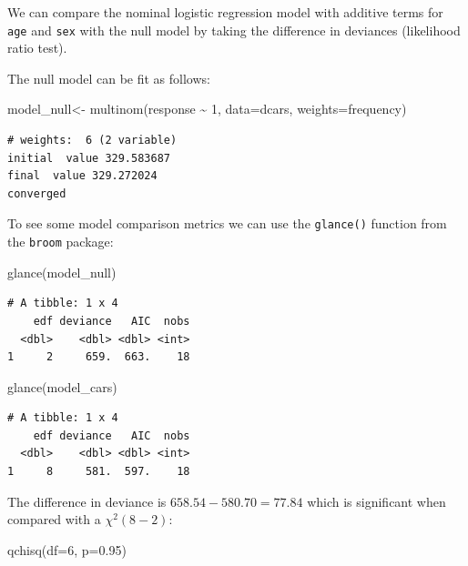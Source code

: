 \documentclass[
  letterpaper,
  DIV=11,
  numbers=noendperiod]{scrartcl}
\newenvironment{Shaded}{\begin{snugshade}}{\end{snugshade}}
\newcommand{\AttributeTok}[1]{\textcolor[rgb]{0.40,0.45,0.13}{#1}}
\newcommand{\DecValTok}[1]{\textcolor[rgb]{0.68,0.00,0.00}{#1}}
\newcommand{\FloatTok}[1]{\textcolor[rgb]{0.68,0.00,0.00}{#1}}
\newcommand{\FunctionTok}[1]{\textcolor[rgb]{0.28,0.35,0.67}{#1}}
\newcommand{\NormalTok}[1]{\textcolor[rgb]{0.00,0.23,0.31}{#1}}
\newcommand{\OtherTok}[1]{\textcolor[rgb]{0.00,0.23,0.31}{#1}}
\newcommand{\SpecialCharTok}[1]{\textcolor[rgb]{0.37,0.37,0.37}{#1}}
\begin{document}
We can compare the nominal logistic regression model with additive terms
for \texttt{age} and \texttt{sex} with the null model by taking the
difference in deviances (likelihood ratio test).

The null model can be fit as follows:

\begin{Shaded}
\begin{Highlighting}[]
\NormalTok{model\_null}\OtherTok{\textless{}{-}} \FunctionTok{multinom}\NormalTok{(response }\SpecialCharTok{\textasciitilde{}} \DecValTok{1}\NormalTok{, }\AttributeTok{data=}\NormalTok{dcars, }\AttributeTok{weights=}\NormalTok{frequency)}
\end{Highlighting}
\end{Shaded}

\begin{verbatim}
# weights:  6 (2 variable)
initial  value 329.583687 
final  value 329.272024 
converged
\end{verbatim}

To see some model comparison metrics we can use the \texttt{glance()}
function from the \texttt{broom} package:

\begin{Shaded}
\begin{Highlighting}[]
\FunctionTok{glance}\NormalTok{(model\_null)}
\end{Highlighting}
\end{Shaded}

\begin{verbatim}
# A tibble: 1 x 4
    edf deviance   AIC  nobs
  <dbl>    <dbl> <dbl> <int>
1     2     659.  663.    18
\end{verbatim}

\begin{Shaded}
\begin{Highlighting}[]
\FunctionTok{glance}\NormalTok{(model\_cars)}
\end{Highlighting}
\end{Shaded}

\begin{verbatim}
# A tibble: 1 x 4
    edf deviance   AIC  nobs
  <dbl>    <dbl> <dbl> <int>
1     8     581.  597.    18
\end{verbatim}

The difference in deviance is \(658.54-580.70=77.84\) which is
significant when compared with a \(\chi^2(8-2)\):

\begin{Shaded}
\begin{Highlighting}[]
\FunctionTok{qchisq}\NormalTok{(}\AttributeTok{df=}\DecValTok{6}\NormalTok{, }\AttributeTok{p=}\FloatTok{0.95}\NormalTok{)}
\end{Highlighting}
\end{Shaded}
\end{document}
